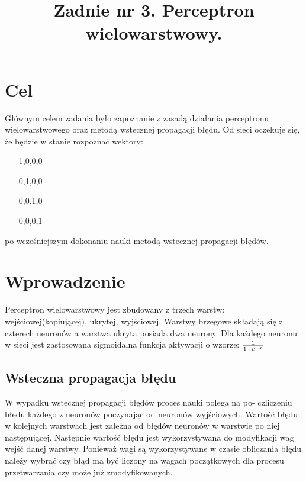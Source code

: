 \documentclass{classrep}
\author{
  \studentinfo{Szymon Łyszkowski}{206809}\and
  \studentinfo{Piotr Kluch}{206799}
}
\title{Zadnie nr 3. Perceptron wielowarstwowy.}
\begin{document}
\maketitle

\section{Cel}
{
Głównym celem zadania było zapoznanie z zasadą działania perceptronu wielowarstwowego oraz metodą wstecznej propagacji błędu. Od sieci oczekuje się, że
będzie w stanie rozpoznać wektory: 
\begin{itemize}
	\item [1,0,0,0]
	\item [0,1,0,0]
	\item [0,0,1,0]
	\item [0,0,0,1]
\end{itemize} po wcześniejszym dokonaniu nauki metodą wstecznej propagacji błędów.
\section{Wprowadzenie}
{Perceptron wielowarstwowy jest zbudowany z trzech warstw: wejściowej(kopiującej), ukrytej, wyjściowej. Warstwy brzegowe składają się z czterech neuronów a
warstwa ukryta posiada dwa neurony. Dla każdego neuronu w sieci jest zastosowana sigmoidalna funkcja aktywacji o wzorze: \begin{math}
                                                                                                                    1\over1+e^{-x}
                                                                                                                    \end{math}
                                                                                                       
                                                                                                       \subsection{Wsteczna propagacja błędu}
W  wypadku  wstecznej  propagacji  błędów  proces  nauki  polega  na  po-
czliczeniu błędu każdego z neuronów poczynając od neuronów wyjściowych.
Wartość błędu w kolejnych warstwach jest zależna od błędów neuronów w
warstwie po niej następującej. Następnie wartość błędu jest wykorzystywana
do modyfikacji wag wejść danej warstwy. Ponieważ wagi są wykorzystywane
w czasie obliczania błędu należy wybrać czy błąd ma być liczony na wagach
początkowych dla procesu przetwarzania czy może już zmodyfikowanych.
}}
\end{document}
